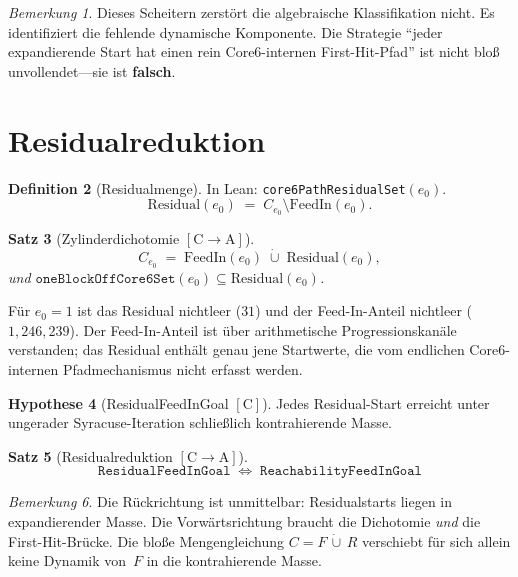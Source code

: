 \documentclass[11pt,a4paper]{article}
\newtheorem{theorem}{Satz}
\theoremstyle{definition}
\newtheorem{definition}[theorem]{Definition}
\newtheorem{hypothesis}[theorem]{Hypothese}
\theoremstyle{remark}
\newtheorem{remark}[theorem]{Bemerkung}
\newcommand{\CA}{\ensuremath{[\mathrm{C}\!\to\!\mathrm{A}]}}
\newcommand{\tagC}{\ensuremath{[\mathrm{C}]}}
\newcommand{\FeedIn}{\mathrm{FeedIn}}
\newcommand{\Residual}{\mathrm{Residual}}
\begin{document}
\begin{remark}
Dieses Scheitern zerstört die algebraische Klassifikation nicht. Es
identifiziert die fehlende dynamische Komponente. Die Strategie
``jeder expandierende Start hat einen rein Core6-internen First-Hit-Pfad''
ist nicht bloß unvollendet---sie ist \textbf{falsch}.
\end{remark}

\section{Residualreduktion}

\begin{definition}[Residualmenge]
In Lean: \texttt{core6PathResidualSet}$(e_0)$.
\[
  \Residual(e_0)
  \;=\;
  C_{e_0}\setminus\FeedIn(e_0).
\]
\end{definition}

\begin{theorem}[Zylinderdichotomie \CA]
\[
  C_{e_0}
  \;=\;
  \FeedIn(e_0)
  \;\dot\cup\;
  \Residual(e_0),
\]
und $\mathtt{oneBlockOffCore6Set}(e_0)\subseteq\Residual(e_0)$.
\end{theorem}

Für $e_0=1$ ist das Residual nichtleer ($31$) und der Feed-In-Anteil
nichtleer ($1{,}246{,}239$). Der Feed-In-Anteil ist über arithmetische
Progressionskanäle verstanden; das Residual enthält genau jene Startwerte,
die vom endlichen Core6-internen Pfadmechanismus nicht erfasst werden.

\begin{hypothesis}[ResidualFeedInGoal \tagC]
Jedes Residual-Start erreicht unter ungerader Syracuse-Iteration schließlich
kontrahierende Masse.
\end{hypothesis}

\begin{theorem}[Residualreduktion \CA]
\[
  \boxed{
  \mathtt{ResidualFeedInGoal}
  \;\Longleftrightarrow\;
  \mathtt{ReachabilityFeedInGoal}
  }
\]
\end{theorem}

\begin{remark}
Die Rückrichtung ist unmittelbar: Residualstarts liegen in expandierender
Masse. Die Vorwärtsrichtung braucht die Dichotomie \emph{und} die
First-Hit-Brücke. Die bloße Mengengleichung
$C=F\,\dot\cup\,R$ verschiebt für sich allein keine Dynamik von~$F$ in die
kontrahierende Masse.
\end{remark}
\end{document}

